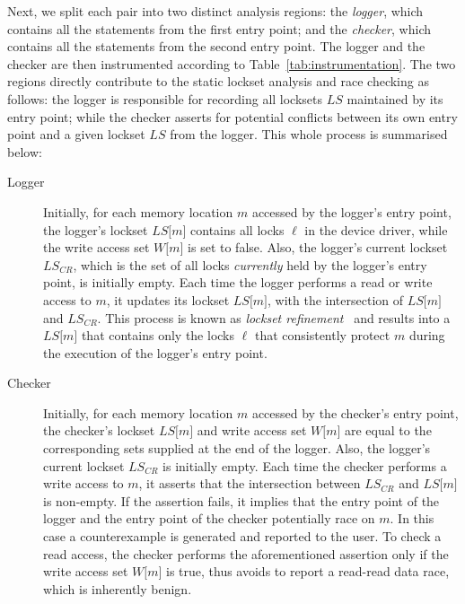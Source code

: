 Next, we split each pair into two distinct analysis regions: the \emph{logger}, which contains all the statements from the first entry point; and the \emph{checker}, which contains all the statements from the second entry point. The logger and the checker are then instrumented according to Table~\ref{tab:instrumentation}. The two regions directly contribute to the static lockset analysis and race checking as follows: the logger is responsible for recording all locksets $\mathit{LS}$ maintained by its entry point; while the checker asserts for potential conflicts between its own entry point and a given lockset $\mathit{LS}$ from the logger. This whole process is summarised below:

\begin{description}
  \item[Logger] Initially, for each memory location $m$ accessed by the logger's entry point, the logger's lockset $\mathit{LS}\lbrack m\rbrack$ contains all locks $\ell$ in the device driver, while the write access set $W\lbrack m\rbrack$ is set to false. Also, the logger's current lockset $\mathit{LS}_{CR}$, which is the set of all locks \emph{currently} held by the logger's entry point, is initially empty. Each time the logger performs a read or write access to $m$, it updates its lockset $\mathit{LS}\lbrack m\rbrack$, with the intersection of $\mathit{LS}\lbrack m\rbrack$ and $\mathit{LS}_{CR}$. This process is known as \emph{lockset refinement}~\cite{savage1997eraser} and results into a $\mathit{LS}\lbrack m\rbrack$ that contains only the locks $\ell$ that consistently protect $m$ during the execution of the logger's entry point.
  
  \item[Checker] Initially, for each memory location $m$ accessed by the checker's entry point, the checker's lockset $\mathit{LS}\lbrack m\rbrack$ and write access set $W\lbrack m\rbrack$ are equal to the corresponding sets supplied at the end of the logger. Also, the logger's current lockset $\mathit{LS}_{CR}$ is initially empty. Each time the checker performs a write access to $m$, it asserts that the intersection between $\mathit{LS}_{CR}$ and $\mathit{LS}\lbrack m\rbrack$ is non-empty. If the assertion fails, it implies that the entry point of the logger and the entry point of the checker potentially race on $m$. In this case a counterexample is generated and reported to the user. To check a read access, the checker performs the aforementioned assertion only if the write access set $W\lbrack m\rbrack$ is true, thus avoids to report a read-read data race, which is inherently benign.
\end{description}